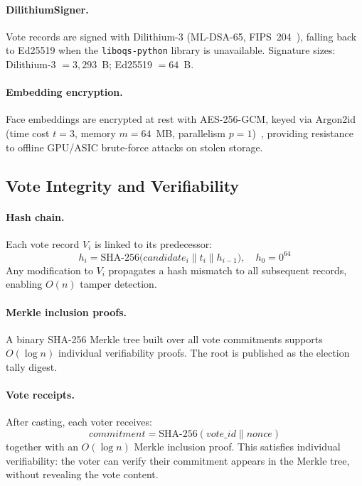 \documentclass[preprint,12pt]{elsarticle}
\begin{document}
\paragraph{DilithiumSigner.} Vote records are signed with Dilithium-3
(ML-DSA-65, FIPS~204~\cite{nist_fips204}), falling back to Ed25519 when
the \texttt{liboqs-python} library is unavailable. Signature sizes:
Dilithium-3 $= 3{,}293$~B; Ed25519 $= 64$~B.

\paragraph{Embedding encryption.} Face embeddings are encrypted at rest
with AES-256-GCM, keyed via Argon2id (time cost $t=3$, memory $m=64$~MB,
parallelism $p=1$)~\cite{biryukov2015argon2}, providing resistance to
offline GPU/ASIC brute-force attacks on stolen storage.

\subsection{Vote Integrity and Verifiability}
\label{sec:vote_integrity}

\paragraph{Hash chain.} Each vote record $V_i$ is linked to its predecessor:
\begin{equation}
  h_i = \mathrm{SHA}\text{-}256\!\bigl(\mathit{candidate}_i \| t_i \| h_{i-1}\bigr),
  \quad h_0 = 0^{64}
\end{equation}
Any modification to $V_i$ propagates a hash mismatch to all subsequent
records, enabling $O(n)$ tamper detection.

\paragraph{Merkle inclusion proofs.} A binary SHA-256 Merkle tree built over
all vote commitments supports $O(\log n)$ individual verifiability proofs.
The root is published as the election tally digest.

\paragraph{Vote receipts.} After casting, each voter receives:
\begin{equation}
  \mathit{commitment} = \mathrm{SHA}\text{-}256(\mathit{vote\_id} \| \mathit{nonce})
\end{equation}
together with an $O(\log n)$ Merkle inclusion proof. This satisfies
individual verifiability: the voter can verify their commitment appears
in the Merkle tree, without revealing the vote content.
\end{document}
